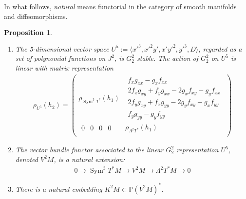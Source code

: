 \documentclass[12pt]{article}
\numberwithin{equation}{section}
\theoremstyle{plain}
\newtheorem{proposition}[definition]{Proposition}
\theoremstyle{definition}
\renewcommand{\P}{\mathbb{P}}
\renewcommand{\L}{\Lambda}
\newcommand{\ra}{\rightarrow}
\begin{document}
In what follows, \emph{natural} means functorial in the category of smooth manifolds and diffeomorphisms.
\begin{proposition}\label{linearizeToU5}\
\begin{enumerate}
\itemsep0em
\item{\label{matrepU5}The 5-dimensional vector space $U^{5}:=\langle x'^{3},x'^{2}y',x'y'^{2},y'^{3},D\rangle$, regarded as a set of polynomial functions on $J^{2}$, is $G^{2}_{2}$ stable. The action of $G^{2}_{2}$ on $U^{5}$ is linear with matrix representation
\begin{align*}
\rho_{U^{5}}(h_2)=
\begin{pmatrix}
\rho_{\operatorname{Sym}^{3}T^{*}}(h_1) & \begin{matrix}
f_{x}g_{xx}-g_{x}f_{xx}\\
2f_{x}g_{xy}+f_{y}g_{xx}-2g_{x}f_{xy}-g_{y}f_{xx}\\
2f_{y}g_{xy}+f_{x}g_{yy}-2g_{y}f_{xy}-g_{x}f_{yy}\\
f_{y}g_{yy}-g_{y}f_{yy} \end{matrix}\\
\begin{matrix} 0 & 0 & 0 &0 \end{matrix} & \rho_{\L^{2}T^{*}}(h_1)\\
\end{pmatrix}
\end{align*}}
\item{\label{v2extension}The vector bundle functor associated to the linear $G^{2}_{2}$ representation $U^{5}$, denoted $V^{2}M$, is a natural extension:
\begin{align*}
0\ra \operatorname{Sym}^{3}T^{*}M\ra V^{2}M \ra \L^{2}T^{*}M\ra 0
\end{align*}}
\item{\label{k2emb}There is a natural embedding $K^{2}M\subset \P(V^{2}M)^{*}$.}
\end{enumerate}
\end{proposition}
\end{document}
